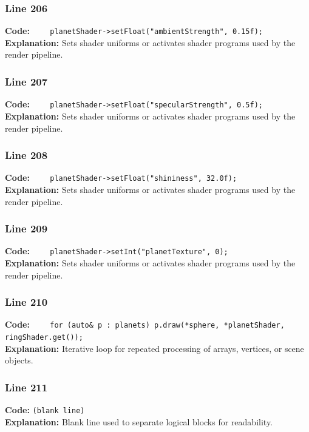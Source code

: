 \documentclass[11pt,a4paper]{article}
\begin{document}
\subsubsection*{Line 206}
\textbf{Code:} \verb|    planetShader->setFloat("ambientStrength", 0.15f);|\\
\textbf{Explanation:} Sets shader uniforms or activates shader programs used by the render pipeline.

\subsubsection*{Line 207}
\textbf{Code:} \verb|    planetShader->setFloat("specularStrength", 0.5f);|\\
\textbf{Explanation:} Sets shader uniforms or activates shader programs used by the render pipeline.

\subsubsection*{Line 208}
\textbf{Code:} \verb|    planetShader->setFloat("shininess", 32.0f);|\\
\textbf{Explanation:} Sets shader uniforms or activates shader programs used by the render pipeline.

\subsubsection*{Line 209}
\textbf{Code:} \verb|    planetShader->setInt("planetTexture", 0);|\\
\textbf{Explanation:} Sets shader uniforms or activates shader programs used by the render pipeline.

\subsubsection*{Line 210}
\textbf{Code:} \verb|    for (auto& p : planets) p.draw(*sphere, *planetShader, ringShader.get());|\\
\textbf{Explanation:} Iterative loop for repeated processing of arrays, vertices, or scene objects.

\subsubsection*{Line 211}
\textbf{Code:} \texttt{(blank line)}\\
\textbf{Explanation:} Blank line used to separate logical blocks for readability.
\end{document}
